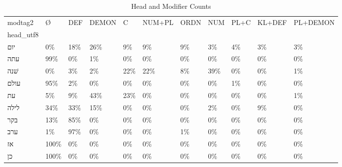 \begin{table}[htbp!]
\centering
\caption{Head and Modifier Counts}
\label{table:pos_modi_pr}
\begin{tabular}{lllllllllll}
\toprule
modtag2 &     Ø &  DEF & DEMON &    C & NUM+PL & ORDN &  NUM & PL+C & KL+DEF & PL+DEMON \\
head\_utf8 &       &      &       &      &        &      &      &      &        &          \\
\midrule
יום       &    0\% &  18\% &   26\% &   9\% &     9\% &   9\% &   3\% &   4\% &     3\% &       3\% \\
עתה       &   99\% &   0\% &    1\% &   0\% &     0\% &   0\% &   0\% &   0\% &     0\% &       0\% \\
שׁנה      &    0\% &   3\% &    2\% &  22\% &    22\% &   8\% &  39\% &   0\% &     0\% &       1\% \\
עולם      &   95\% &   2\% &    0\% &   0\% &     0\% &   0\% &   0\% &   1\% &     0\% &       0\% \\
עת        &    5\% &   9\% &   43\% &  23\% &     0\% &   0\% &   0\% &   0\% &     0\% &       1\% \\
לילה      &   34\% &  33\% &   15\% &   0\% &     0\% &   0\% &   2\% &   0\% &     9\% &       0\% \\
בקר       &   13\% &  85\% &    0\% &   0\% &     0\% &   0\% &   0\% &   0\% &     0\% &       0\% \\
ערב       &    1\% &  97\% &    0\% &   0\% &     0\% &   1\% &   0\% &   0\% &     0\% &       0\% \\
אז        &  100\% &   0\% &    0\% &   0\% &     0\% &   0\% &   0\% &   0\% &     0\% &       0\% \\
כן        &  100\% &   0\% &    0\% &   0\% &     0\% &   0\% &   0\% &   0\% &     0\% &       0\% \\
\bottomrule
\end{tabular}
\end{table}
